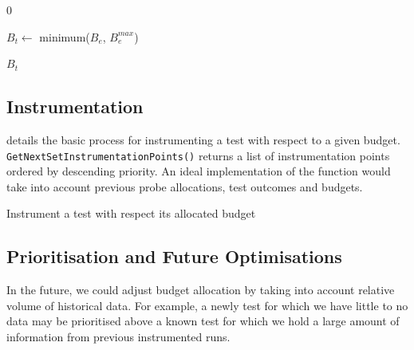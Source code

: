 {\begin{algorithm}[H]
\begin{algorithmic}[1]
	\EndFunction
	\Statex


		\Return $0$
	\EndIf

	\State $B_t \gets$ minimum($B_e$, $B_{e}^{max}$)

	\State \Return $B_t$

	\EndFunction
\end{algorithmic}

\end{algorithm}


\subsection{Instrumentation}

 details the basic process for instrumenting a test
with respect to a given budget. {\tt GetNextSetInstrumentationPoints()} returns
a list of instrumentation points ordered by descending priority. An ideal
implementation of the function would take into account previous probe
allocations, test outcomes and budgets.

\begin{algorithm}[H]
\caption{Instrument a test with respect its allocated budget}
\label{alg:instrument_test}

\begin{algorithmic}
	\Statex


			\Else
			\EndIf
		\EndFor
	\EndWhile

	\EndFunction
\end{algorithmic}

\end{algorithm}


\subsection{Prioritisation and Future Optimisations}

In the future, we could adjust \flaky budget allocation by taking into account
relative volume of historical data. For example, a newly \flaky test for which
we have little to no data may be prioritised above a known \flaky test for which
we hold a large amount of information from previous instrumented runs.

}
